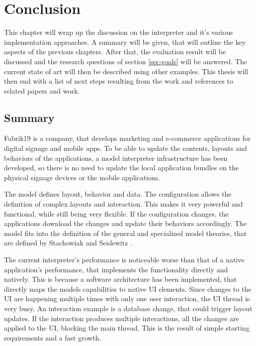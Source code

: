 
\chapter{Conclusion}

This chapter will wrap up the discussion on the interpreter and it's various implementation approaches.
A summary will be given, that will outline the key aspects of the previous chapters.
After that, the evaluation result will be discussed and the research questions of section \ref{sec:goals} will be answered.
The current state of art will then be described using other examples.
This thesis will then end with a list of next steps resulting from the work and references to related papers and work.

\section{Summary}


Fabrik19 is a company, that develops marketing and e-commerce applications for digital signage and mobile apps.
To be able to update the contents, layouts and behaviors of the applications, a model interpreter infrastructure has been developed, so there is no need to update the local application bundles on the physical signage devices or the mobile applications.

The model defines layout, behavior and data.
The configuration allows the definition of complex layouts and interaction.
This makes it very powerful and functional, while still being very flexible.
If the configuration changes, the applications download the changes and update their behaviors accordingly.
The model fits into the definition of the general and specialized model theories, that are defined by Stachowiak \cite{stachowiak_allgemeine_1973} and Seidewitz \cite{seidewitz_what_2003}.

The current interpreter's performance is noticeable worse than that of a native application's performance, that implements the functionality directly and natively.
This is because a software architecture has been implemented, that directly maps the models capabilities to native \ac{UI} elements.
Since changes to the \ac{UI} are happening multiple times with only one user interaction, the \ac{UI} thread is very busy.
An interaction example is a database change, that could trigger layout updates.
If the interaction produces multiple interactions, all the changes are applied to the \ac{UI}, blocking the main thread.
This is the result of simple starting requirements and a fast growth.

